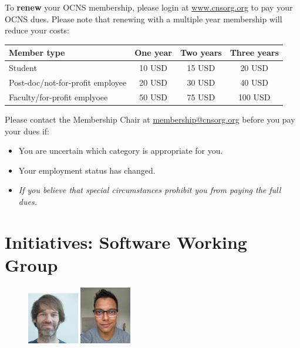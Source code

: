 \documentclass[11pt,a4paper,oneside]{article}
\begin{document}
To \textbf{renew} your OCNS membership, please login at \href{www.cnsorg.org}{www.cnsorg.org} to pay your OCNS dues.
Please note that renewing with a multiple year membership will reduce your costs:

\begin{table}[!h]
  \centering
  \begin{tabularx}{0.7\textwidth}{X|ccc}
    \textbf{Member type}& \textbf{One year} & \textbf{Two years} & \textbf{Three years} \\
    \toprule{}
    Student & 10 USD & 15 USD & 20 USD \\
    Post-doc/not-for-profit employee & 20 USD & 30 USD & 40 USD \\
    Faculty/for-profit emplyoee& 50 USD & 75 USD & 100 USD \\
  \end{tabularx}
\end{table}

Please contact the Membership Chair at \href{mailto:membership@cnsorg.org}{membership@cnsorg.org} before you pay your dues if:
\begin{itemize}
  \item You are uncertain which category is appropriate for you.
  \item Your employment status has changed.
\item \emph{If you believe that special circumstances prohibit you from paying the full dues.}
\end{itemize}


\clearpage
\section*{Initiatives: Software Working Group}%
\begin{figure}
  \includegraphics[width=0.2\textwidth]{images/marcel}
  \includegraphics[width=0.2\textwidth]{images/ankur-sinha}
\end{figure}
\end{document}
